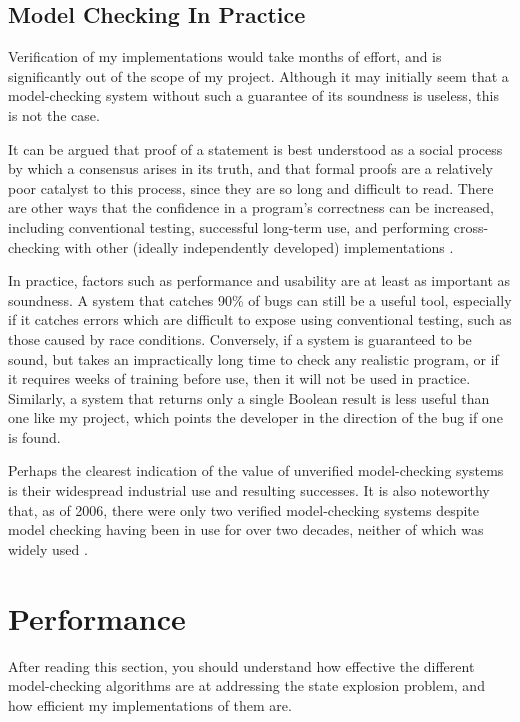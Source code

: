 \documentclass[12pt,a4paper,twoside,openany]{report}
\begin{document}
\subsection{Model Checking In Practice}
Verification of my implementations
would take months of
effort, and is significantly out
of the scope of my project.
Although it may initially seem
that a model-checking system without
such a guarantee of its
soundness is useless, this
is not the case.

It can be argued \cite{demi79}
that proof of a statement
is best understood as a social process
by which a consensus arises in its
truth, and that formal proofs are a relatively
poor catalyst to this process, since
they are so long and difficult to
read.
There are other
ways that the confidence in a program's
correctness can be increased, including
conventional testing, successful
long-term use, and performing
cross-checking with other (ideally
independently developed) implementations
\cite{beck06, tau02}.

In practice, factors such as
performance and usability are at least
as important as soundness. A system that
catches 90\% of bugs can still be a
useful tool, especially if it catches
errors which are difficult to expose
using conventional testing, such as
those caused by race conditions. 
Conversely, if a system
is guaranteed to be sound, but takes an
impractically long time to check any realistic
program, or if it requires
weeks of training before use,
then it will not be used in
practice.
Similarly, a system that
returns only a single Boolean result
is less useful
than one like my project, which points the developer
in the direction of the bug if
one is found.

Perhaps the clearest indication of the
value of unverified
model-checking systems is their widespread
industrial use and resulting successes.
\cite{kur08, brat04, low96, kars96, cof10, mill08, new15}
It is also noteworthy that, as of 2006,
there were only
two verified model-checking
systems despite model
checking having been in use for
over two decades,
neither of which was widely
used \cite{beck06}.


\section{Performance}
After reading this section, you should
understand how effective the different
model-checking algorithms are at
addressing the state explosion
problem, and how efficient
my implementations of them are.
\end{document}
